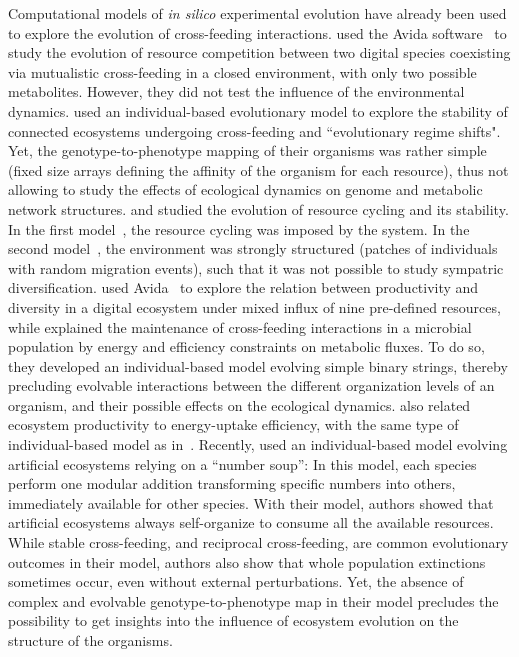 Computational models of \textit{in silico} experimental evolution have already been used to explore the evolution of cross-feeding interactions. \cite{johnson-wilke-2004} used the Avida software~\citep{ofria-and-wilke-2004} to study the evolution of resource competition between two digital species coexisting via mutualistic cross-feeding in a closed environment, with only two possible metabolites. However, they did not test the influence of the environmental dynamics. \cite{williams-lenton-2010} used an individual-based evolutionary model to explore the stability of connected ecosystems undergoing cross-feeding and ``evolutionary regime shifts". Yet, the genotype-to-phenotype mapping of their organisms was rather simple (fixed size arrays defining the affinity of the organism for each resource), thus not allowing to study the effects of ecological dynamics on genome and metabolic network structures. \cite{crombach-hogeweg-2009} and \cite{boyle-et-al-2012} studied the evolution of resource cycling and its stability. In the first model~\citep{crombach-hogeweg-2009}, the resource cycling was imposed by the system. In the second model~\citep{boyle-et-al-2012}, the environment was strongly structured (patches of individuals with random migration events), such that it was not possible to study sympatric diversification. \cite{chow-et-al-2004} used Avida~\citep{ofria-and-wilke-2004} to explore the relation between productivity and diversity in a digital ecosystem under mixed influx of nine pre-defined resources, while \cite{gerlee-lundh-2010a} explained the maintenance of cross-feeding interactions in a microbial population by energy and efficiency constraints on metabolic fluxes. To do so, they developed an individual-based model evolving simple binary strings, thereby precluding evolvable interactions between the different organization levels of an organism, and their possible effects on the ecological dynamics.
\cite{gerlee-lundh-2010b} also related ecosystem productivity to energy-uptake efficiency, with the same type of individual-based model as in~\cite{gerlee-lundh-2010a}.
Recently, \cite{liu-and-sumpter-2017} used an individual-based model evolving artificial ecosystems relying on a ``number soup'': In this model, each species perform one modular addition transforming specific numbers into others, immediately available for other species. With their model, authors showed that artificial ecosystems always self-organize to consume all the available resources. While stable cross-feeding, and reciprocal cross-feeding, are common evolutionary outcomes in their model, authors also show that whole population extinctions sometimes occur, even without external perturbations. Yet, the absence of complex and evolvable genotype-to-phenotype map in their model precludes the possibility to get insights into the influence of ecosystem evolution on the structure of the organisms.
